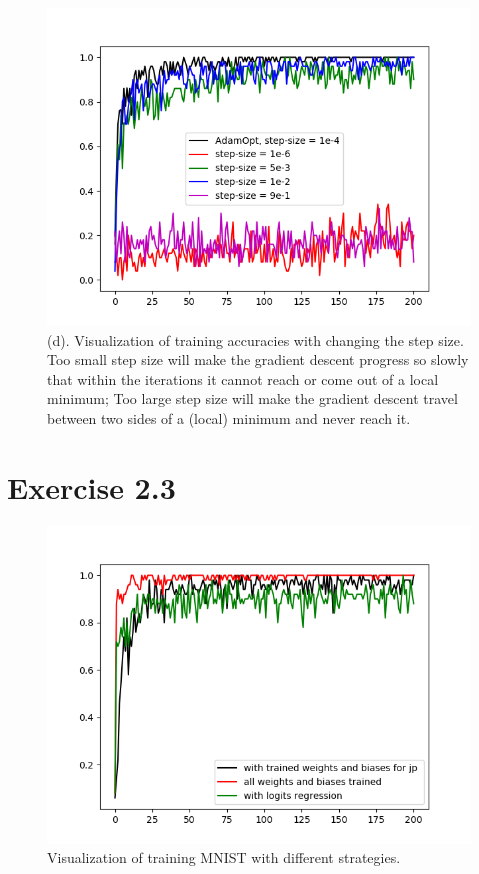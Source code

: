 \documentclass[11pt]{article} %
\begin{document}
\begin{figure}[htb]
  \centering
  \centerline{\includegraphics[width=1\textwidth ]{Figure_2_5.png}}
  \vspace{-5pt}
    \centering
\caption{(d). Visualization of training accuracies with changing the step size. Too small step size will make the gradient descent progress so slowly that within the iterations it cannot reach or come out of a local minimum; Too large step size will make the gradient descent travel between two sides of a (local) minimum and never reach it.}
\vspace{-1pt}
\end{figure}
\clearpage

\section*{Exercise 2.3}

\begin{figure}[htb]
  \centering
  \centerline{\includegraphics[width=1\textwidth ]{Figure_3.png}}
  \vspace{-5pt}
    \centering
\caption{Visualization of training MNIST with different strategies.}
\vspace{-1pt}
\end{figure}
\clearpage
\end{document}
